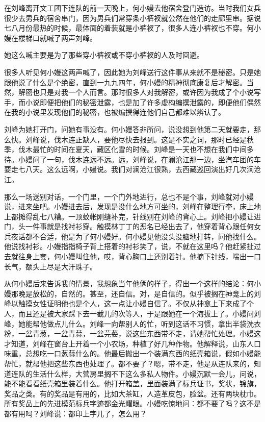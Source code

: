 \documentclass[12pt,twoside,openany]{book}
\begin{document}
在刘峰离开文工团下连队的前一天晚上，何小嫚去他宿舍登门造访。当时我们女兵很少去男兵的宿舍串门，因为男兵们常穿条小裤衩就公然在他们的走廊里串。据说七八月份最热的时候，最体面的着装就是小裤衩了，很多人连小裤衩也不穿。何小嫚在楼梯口就喊了两声刘峰。

她这么喊主要是为了那些穿小裤衩或不穿小裤衩的人及时回避。

很多人听见何小嫚这两声喊了，因此她为刘峰送行这件事从来就不是秘密。只是她跟他说了什么是个绝密，直到一九九四年，何小嫚的精神彻底康复后才解密。当然，解密也只是对我一个人而言。那时很多人对我解密，或许因为我成了个小说写手，而小说即便把他们的秘密泄露，也是加了许多虚构编撰泄露的，即便他们偶然在我的小说里发现他们的秘密，也被编撰得连他们自己都难以辨认了。

刘峰为她打开门，问她有事没有。何小嫚答非所问，说没想到他第二天就要走，那么快。刘峰说，伐木连正缺人，要他尽快去报到。这是不实之词，那时已经是秋季，伐木最忙的时间在夏天，藏区化雪的时候。刘峰是一天也不想在我们中间多待。小嫚问了一句，伐木连远不远。远，刘峰说，在澜沧江那一边，坐汽车团的车要走七八天。这么远啊，小嫚说。我们对澜沧江很熟，去西藏巡回演出好几次澜沧江。

那么一场送别对话，一个门里，一个门外地进行，总也不是个事，刘峰就对小嫚说，进来坐吧。小嫚进去后，发现是没什么地方可坐的，刘峰在整理行李，床上地上都摊得乱七八糟。一顶蚊帐刚缝补完，针线别在刘峰的背心上。刘峰把小嫚让进门，头一件事就是找衬衫穿。触摸林丁丁的恶名已经出去了，他穿着背心跟任何女兵夜话都不合适，他是为了何小嫚好。何小嫚见他没头没脑地打转，问他找什么。他说找衬衫。小嫚指指椅子背上搭着的衬衫笑了，说，不就在这里吗？他赶紧扯过去就往身上套，何小嫚叫住他，哎，背心胸口上还别着针。他摘下针线，喘出一口长气，额头上尽是大汗珠子。

从何小嫚后来告诉我的情景，我想象当年他俩的样子，得出一个这样的结论：何小嫚那晚是放松的，自然的。甚至，还自信。对，是自信的。似乎被搁在神龛上的刘峰以触摸女性证明他也是个人，这一点让小嫚自信了。不仅从神龛上下来成了个人，而且还是被大家踩下去一截儿的次等人，于是跟她在一个海拔上了。小嫚问刘峰，她能帮他做点儿什么。刘峰一向帮别人的忙，听到这话不习惯，拿出半袋洗衣粉，一盆青葱，一盆青蒜，一盆芫荽，说这些东西带不走，请她帮忙处理。小嫚这才知道，刘峰在窗台上开着一个小农场，种植了好几种作物。他解释说，山东人口味重，总想吃一口葱蒜什么的。他最后搬出一个装满东西的纸壳箱说，假如小嫚能帮忙，就帮他把这些东西也处理了。都不要了？嗯，带不走，他是从连队来的，知道连队的生活什么样，大营房里搁不下这么多私人物件。小嫚沉默一会儿，问说，能不能看看纸壳箱里装着什么。他打开箱盖，里面装满了标兵证书，奖状，锦旗，奖品之类。有的奖品是有用的，比如大茶缸，人造革皮包，脸盆。还有两块枕巾。所有奖品上的先进模范标兵字迹都金光耀眼。小嫚吃惊地问：都不要了吗？这不是都有用吗？刘峰说：都印上字儿了，怎么用？
\end{document}
